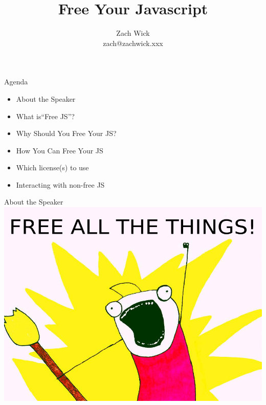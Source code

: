 \documentclass[11pt]{beamer}
\author{Zach Wick \\ zach@zachwick.xxx}
\title{Free Your Javascript}
\begin{document}

\begin{frame}
\titlepage
\end{frame}


\begin{frame}{Agenda}
\begin{itemize}
\item About the Speaker\\
\item What is``Free JS''?\\
\item Why Should You Free Your JS?\\
\item How You Can Free Your JS\\
\item Which license(s) to use\\
\item Interacting with non-free JS\\
\end{itemize}
\end{frame}

\begin{frame}{About the Speaker}
\includegraphics[keepaspectratio=true,width=\framewidth]{all_the_things.png}
\end{frame}
\end{document}
